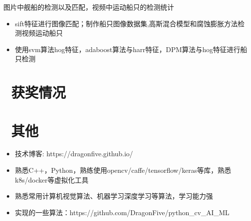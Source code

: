 \documentclass{resume}
\begin{document}
图片中舰船的检测以及匹配，视频中运动船只的检测统计
\begin{itemize}
  \item sift特征进行图像匹配；制作船只图像数据集,高斯混合模型和腐蚀膨胀方法检测视频运动船只
  \item 使用svm算法hog特征，adaboost算法与harr特征，DPM算法与hog特征进行船只检测
\end{itemize}




\section{\faHeartO\ 获奖情况}

\section{\faInfo\ 其他}
\begin{itemize}[parsep=0.5ex]
  \item 技术博客: https://dragonfive.github.io/
  \item 熟悉C++，Python，熟练使用opencv/caffe/tensorflow/keras等库，熟悉k8s/docker等虚拟化工具
  \item 熟悉常用计算机视觉算法、机器学习深度学习等算法，学习能力强
  \item 实现的一些算法：https://github.com/DragonFive/python\_cv\_AI\_ML
\end{itemize}

%
%
\end{document}
